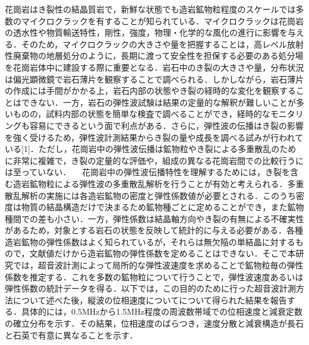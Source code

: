 花崗岩はき裂性の結晶質岩で，新鮮な状態でも造岩鉱物粒程度のスケールでは多数のマイクロクラックを有することが知られている．マイクロクラックは花崗岩の透水性や物質輸送特性，剛性，強度，物理・化学的な風化の進行に影響を与える．そのため，マイクロクラックの大きさや量を把握することは，高レベル放射性廃棄物の地層処分のように，長期に渡って安全性を担保する必要のある処分場を花崗岩体中に建設する際に重要となる．岩石中のき裂の大きさや量，分布状況は偏光顕微鏡で岩石薄片を観察することで調べられる．しかしながら，岩石薄片の作成には手間がかかる上，岩石内部の状態やき裂の経時的な変化を観察することはできない．一方，岩石の弾性波試験は結果の定量的な解釈が難しいことが多いものの，試料内部の状態を簡単な検査で調べることができ，経時的なモニタリングも容易にできるという面で利点がある．さらに，弾性波の伝播はき裂の影響を強く受けるため，弾性波計測結果からき裂の量や成長を調べる試みが行われている[1]．ただし，花崗岩中の弾性波伝播は鉱物粒やき裂による多重散乱のために非常に複雑で，き裂の定量的な評価や，組成の異なる花崗岩間での比較行うには至っていない． 
　花崗岩中の弾性波伝播特性を理解するためには，き裂を含む造岩鉱物粒による弾性波の多重散乱解析を行うことが有効と考えられる．多重散乱解析の実施には各造岩鉱物の密度と弾性係数値が必要とされる．このうち密度は物質の結晶構造だけで決まるため鉱物種ごとに定めることができ，また鉱物種間での差も小さい．一方，弾性係数は結晶軸方向やき裂の有無による不確実性があるため，対象とする岩石の状態を反映して統計的に与える必要がある．各種造岩鉱物の弾性係数はよく知られているが，それらは無欠陥の単結晶に対するもので，文献値だけから造岩鉱物の弾性係数を定めることはできない．そこで本研究では，超音波計測によって局所的な弾性波速度を求めることで鉱物粒毎の弾性係数を推定する．これを多数の鉱物粒について行うことで，弾性波速度あるいは弾性係数の統計データを得る．以下では，この目的のために行った超音波計測方法について述べた後，縦波の位相速度についてについて得られた結果を報告する．具体的には，0.5MHzから1.5MHz程度の周波数帯域での位相速度と減衰定数の確立分布を示す．その結果，位相速度のばらつき，速度分散と減衰構造が長石と石英で有意に異なることを示す．


